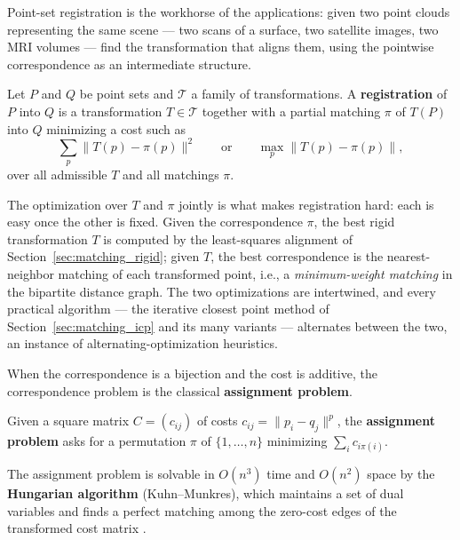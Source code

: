 Point-set registration is the workhorse of the
applications: given two point clouds representing the same scene --- two
scans of a surface, two satellite images, two MRI volumes --- find the
transformation that aligns them, using the pointwise correspondence as an
intermediate structure.

\begin{definition}[Registration]\label{def:match_registration}
  Let $P$ and $Q$ be point sets and $\mathcal{T}$ a family of
  transformations. A \textbf{registration} of $P$ into $Q$ is a
  transformation $T \in \mathcal{T}$ together with a partial matching
  $\pi$ of $T(P)$ into $Q$ minimizing a cost such as
  \[
    \sum_{p} \|T(p) - \pi(p)\|^2
    \qquad\text{or}\qquad
    \max_{p} \|T(p) - \pi(p)\| ,
  \]
  over all admissible $T$ and all matchings $\pi$.
\end{definition}

The optimization over $T$ and $\pi$ jointly is what makes registration hard:
each is easy once the other is fixed. Given the correspondence $\pi$, the
best rigid transformation $T$ is computed by the least-squares alignment of
Section~\ref{sec:matching_rigid}; given $T$, the best correspondence is the
nearest-neighbor matching of each transformed point, i.e., a
\emph{minimum-weight matching} in the bipartite distance graph. The two
optimizations are intertwined, and every practical algorithm --- the
iterative closest point method of Section~\ref{sec:matching_icp} and its
many variants --- alternates between the two, an instance of
alternating-optimization heuristics.

When the correspondence is a bijection and the cost is additive, the
correspondence problem is the classical \textbf{assignment problem}.

\begin{definition}\label{def:match_assignment_problem}
  Given a square matrix $C = (c_{ij})$ of costs $c_{ij} = \|p_i - q_j\|^p$,
  the \textbf{assignment problem} asks for a permutation $\pi$ of
  $\{1,\dots,n\}$ minimizing $\sum_i c_{i\pi(i)}$.
\end{definition}

\begin{theorem}\label{thm:match_hungarian}
  The assignment problem is solvable in $O(n^3)$ time and $O(n^2)$ space by
  the \textbf{Hungarian algorithm} (Kuhn--Munkres), which maintains a set of
  dual variables and finds a perfect matching among the zero-cost edges of
  the transformed cost matrix \cite{kuhn1955,cormen2009}.
\end{theorem}

